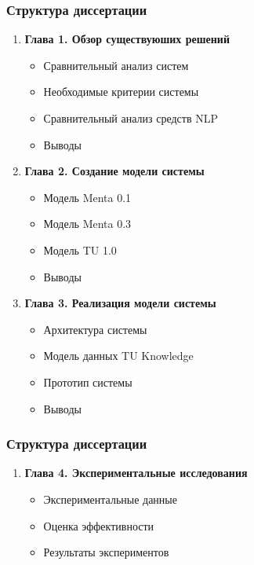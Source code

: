 \documentclass[14pt]{beamer}
\begin{document}
\begin{frame}
\frametitle{Структура диссертации}
\begin{enumerate}
  \item \textbf{Глава 1. Обзор существуюших решений}
  \begin{itemize}
    \item Сравнительный анализ систем
    \item Необходимые критерии системы
    \item Сравнительный анализ средств NLP
    \item Выводы
  \end{itemize}
  \item \textbf{Глава 2. Создание модели системы}
  \begin{itemize}
    \item Модель Menta 0.1
    \item Модель Menta 0.3
    \item Модель TU 1.0
    \item Выводы
  \end{itemize}
  \item \textbf{Глава 3. Реализация модели системы}
  \begin{itemize}
    \item Архитектура системы
    \item Модель данных TU Knowledge
    \item Прототип системы
    \item Выводы
  \end{itemize}
 \end{enumerate}
\end{frame}

\begin{frame}
\frametitle{Структура диссертации}
\begin{enumerate}
 \item \textbf{Глава 4. Экспериментальные исследования}
  \begin{itemize}
    \item Экспериментальные данные
    \item Оценка эффективности
    \item Результаты экспериментов
  \end{itemize}

\end{enumerate}
\end{frame}
\end{document}
